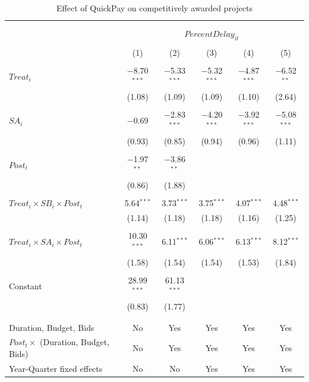 \documentclass[
]{article}
\begin{document}
\begin{table}[H] \centering 
  \caption{Effect of QuickPay on competitively awarded projects} 
  \label{} 
\small 
\begin{tabular}{@{\extracolsep{-2pt}}lccccc} 
\\[-1.8ex]\hline 
\hline \\[-1.8ex] 
\\[-1.8ex] & \multicolumn{5}{c}{$PercentDelay_{it}$  } \\ 
\\[-1.8ex] & (1) & (2) & (3) & (4) & (5)\\ 
\hline \\[-1.8ex] 
 $Treat_i$ & $-$8.70$^{***}$ & $-$5.33$^{***}$ & $-$5.32$^{***}$ & $-$4.87$^{***}$ & $-$6.52$^{**}$ \\ 
  & (1.08) & (1.09) & (1.09) & (1.10) & (2.64) \\ 
  & & & & & \\ 
 $SA_i$ & $-$0.69 & $-$2.83$^{***}$ & $-$4.20$^{***}$ & $-$3.92$^{***}$ & $-$5.08$^{***}$ \\ 
  & (0.93) & (0.85) & (0.94) & (0.96) & (1.11) \\ 
  & & & & & \\ 
 $Post_t$ & $-$1.97$^{**}$ & $-$3.86$^{**}$ &  &  &  \\ 
  & (0.86) & (1.88) &  &  &  \\ 
  & & & & & \\ 
 $Treat_i \times SB_i \times Post_t$ & 5.64$^{***}$ & 3.73$^{***}$ & 3.75$^{***}$ & 4.07$^{***}$ & 4.48$^{***}$ \\ 
  & (1.14) & (1.18) & (1.18) & (1.16) & (1.25) \\ 
  & & & & & \\ 
 $Treat_i \times SA_i \times Post_t$ & 10.30$^{***}$ & 6.11$^{***}$ & 6.06$^{***}$ & 6.13$^{***}$ & 8.12$^{***}$ \\ 
  & (1.58) & (1.54) & (1.54) & (1.53) & (1.84) \\ 
  & & & & & \\ 
 Constant & 28.99$^{***}$ & 61.13$^{***}$ &  &  &  \\ 
  & (0.83) & (1.77) &  &  &  \\ 
  & & & & & \\ 
\hline \\[-1.8ex] 
Duration, Budget, Bids & No & Yes & Yes & Yes & Yes \\ 
$Post_t \times $  (Duration, Budget, Bids) & No & Yes & Yes & Yes & Yes \\ 
Year-Quarter fixed effects & No & No & Yes & Yes & Yes \\ 

\end{tabular}
\end{table}
\end{document}
